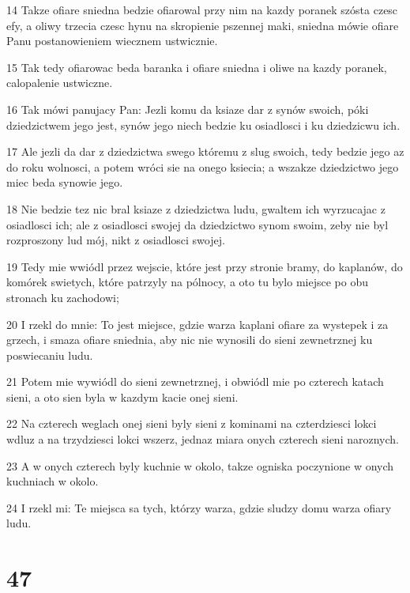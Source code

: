 \par 14 Takze ofiare sniedna bedzie ofiarowal przy nim na kazdy poranek szósta czesc efy, a oliwy trzecia czesc hynu na skropienie pszennej maki, sniedna mówie ofiare Panu postanowieniem wiecznem ustwicznie.
\par 15 Tak tedy ofiarowac beda baranka i ofiare sniedna i oliwe na kazdy poranek, calopalenie ustwiczne.
\par 16 Tak mówi panujacy Pan: Jezli komu da ksiaze dar z synów swoich, póki dziedzictwem jego jest, synów jego niech bedzie ku osiadlosci i ku dziedzicwu ich.
\par 17 Ale jezli da dar z dziedzictwa swego któremu z slug swoich, tedy bedzie jego az do roku wolnosci, a potem wróci sie na onego ksiecia; a wszakze dziedzictwo jego miec beda synowie jego.
\par 18 Nie bedzie tez nic bral ksiaze z dziedzictwa ludu, gwaltem ich wyrzucajac z osiadlosci ich; ale z osiadlosci swojej da dziedzictwo synom swoim, zeby nie byl rozproszony lud mój, nikt z osiadlosci swojej.
\par 19 Tedy mie wwiódl przez wejscie, które jest przy stronie bramy, do kaplanów, do komórek swietych, które patrzyly na pólnocy, a oto tu bylo miejsce po obu stronach ku zachodowi;
\par 20 I rzekl do mnie: To jest miejsce, gdzie warza kaplani ofiare za wystepek i za grzech, i smaza ofiare sniednia, aby nic nie wynosili do sieni zewnetrznej ku poswiecaniu ludu.
\par 21 Potem mie wywiódl do sieni zewnetrznej, i obwiódl mie po czterech katach sieni, a oto sien byla w kazdym kacie onej sieni.
\par 22 Na czterech weglach onej sieni byly sieni z kominami na czterdziesci lokci wdluz a na trzydziesci lokci wszerz, jednaz miara onych czterech sieni naroznych.
\par 23 A w onych czterech byly kuchnie w okolo, takze ogniska poczynione w onych kuchniach w okolo.
\par 24 I rzekl mi: Te miejsca sa tych, którzy warza, gdzie sludzy domu warza ofiary ludu.

\chapter{47}

